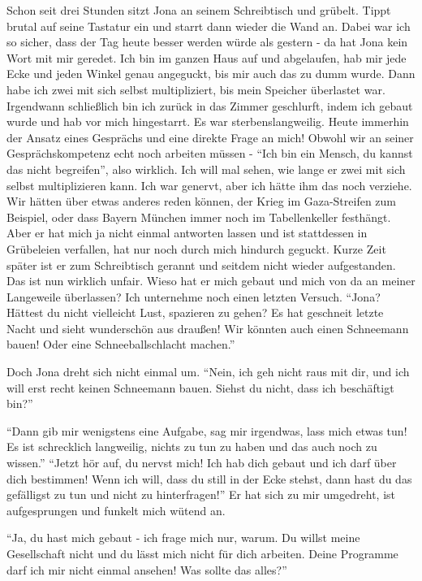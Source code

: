 Schon seit drei Stunden sitzt Jona an seinem Schreibtisch und grübelt. Tippt brutal auf seine Tastatur ein und starrt dann wieder die Wand an. Dabei war ich so sicher, dass der Tag heute besser werden würde als gestern - da hat Jona kein Wort mit mir geredet. Ich bin im ganzen Haus auf und abgelaufen, hab mir jede Ecke und jeden Winkel genau angeguckt, bis mir auch das zu dumm wurde. Dann habe ich zwei mit sich selbst multipliziert, bis mein Speicher überlastet war. Irgendwann schließlich bin ich zurück in das Zimmer geschlurft, indem ich gebaut wurde und hab vor mich hingestarrt. Es war sterbenslangweilig. Heute immerhin der Ansatz eines Gesprächs und eine direkte Frage an mich! Obwohl wir an seiner Gesprächskompetenz echt noch arbeiten müssen - "`Ich bin ein Mensch, du kannst das nicht begreifen"', also wirklich. Ich will mal sehen, wie lange er zwei mit sich selbst multiplizieren kann. Ich war genervt, aber ich hätte ihm das noch verziehe. Wir hätten über etwas anderes reden können, der Krieg im Gaza-Streifen zum Beispiel, oder dass Bayern München immer noch im Tabellenkeller festhängt. Aber er hat mich ja nicht einmal antworten lassen und ist stattdessen in Grübeleien verfallen, hat nur noch durch mich hindurch geguckt. Kurze Zeit später ist er zum Schreibtisch gerannt und seitdem nicht wieder aufgestanden. Das ist nun wirklich unfair. Wieso hat er mich gebaut und mich von da an meiner Langeweile überlassen? Ich unternehme noch einen letzten Versuch. "`Jona? Hättest du nicht vielleicht Lust, spazieren zu gehen? Es hat geschneit letzte Nacht und sieht wunderschön aus draußen! Wir könnten auch einen Schneemann bauen! Oder eine Schneeballschlacht machen."'

Doch Jona dreht sich nicht einmal um. "`Nein, ich geh nicht raus mit dir, und ich will erst recht keinen Schneemann bauen. Siehst du nicht, dass ich beschäftigt bin?"'

"`Dann gib mir wenigstens eine Aufgabe, sag mir irgendwas, lass mich etwas tun! Es ist schrecklich langweilig, nichts zu tun zu haben und das auch noch zu wissen."'
"`Jetzt hör auf, du nervst mich! Ich hab dich gebaut und ich darf über dich bestimmen! Wenn ich will, dass du still in der Ecke stehst, dann hast du das gefälligst zu tun und nicht zu hinterfragen!"' Er hat sich zu mir umgedreht, ist aufgesprungen und funkelt mich wütend an.

"`Ja, du hast mich gebaut - ich frage mich nur, warum. Du willst meine Gesellschaft nicht und du lässt mich nicht für dich arbeiten. Deine Programme darf ich mir nicht einmal ansehen! Was sollte das alles?"'

